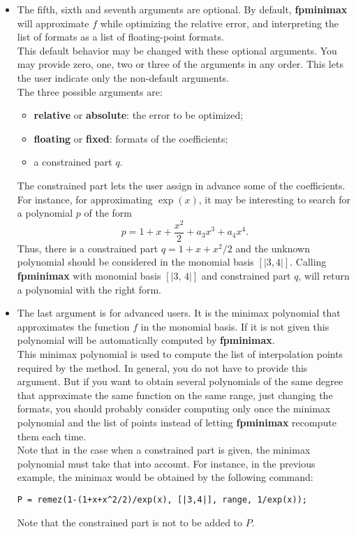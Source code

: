 \begin{itemize}
\item The fifth, sixth and seventh arguments are optional. By default, \textbf{fpminimax}
   will approximate $f$ while optimizing the relative error, and interpreting
   the list of formats as a list of floating-point formats.\\
   This default behavior may be changed with these optional arguments. You
   may provide zero, one, two or three of the arguments in any order.
   This lets the user indicate only the non-default arguments.\\
   The three possible arguments are: \begin{itemize}
   \item \textbf{relative} or \textbf{absolute}: the error to be optimized;
   \item \textbf{floating} or \textbf{fixed}: formats of the coefficients;
   \item a constrained part $q$.
   \end{itemize}
   The constrained part lets the user assign in advance some of the
   coefficients. For instance, for approximating $\exp(x)$, it may
   be interesting to search for a polynomial $p$ of the form
                   $$p = 1 + x + \frac{x^2}{2} + a_3 x^3 + a_4 x^4.$$
   Thus, there is a constrained part $q = 1 + x + x^2/2$ and the unknown
   polynomial should be considered in the monomial basis $[|3, 4|]$.
   Calling \textbf{fpminimax} with monomial basis $[|3,\,4|]$ and constrained
   part $q$, will return a polynomial with the right form.

\item The last argument is for advanced users. It is the minimax polynomial that
   approximates the function $f$ in the monomial basis. If it is not given
   this polynomial will be automatically computed by \textbf{fpminimax}.
   \\
   This minimax polynomial is used to compute the list of interpolation
   points required by the method. In general, you do not have to provide this
   argument. But if you want to obtain several polynomials of the same degree
   that approximate the same function on the same range, just changing the
   formats, you should probably consider computing only once the minimax
   polynomial and the list of points instead of letting \textbf{fpminimax} recompute
   them each time.
   \\
   Note that in the case when a constrained part is given, the minimax 
   polynomial must take that into account. For instance, in the previous
   example, the minimax would be obtained by the following command:
          \begin{center}\verb~P = remez(1-(1+x+x^2/2)/exp(x), [|3,4|], range, 1/exp(x));~\end{center}
   Note that the constrained part is not to be added to $P$.


\end{itemize}
